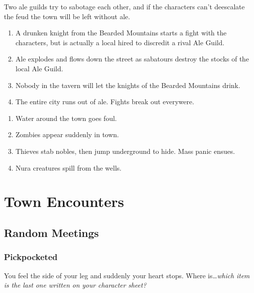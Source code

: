Two ale guilds try to sabotage each other, and if the characters can't deescalate the feud the town will be left without ale.

\begin{enumerate}

	\item{A drunken knight from the Bearded Mountains starts a fight with the characters, but is actually a local hired to discredit a rival Ale Guild.}
	\item{Ale explodes and flows down the street as sabatours destroy the stocks of the local Ale Guild.}
	\item{Nobody in the tavern will let the knights of the Bearded Mountains drink.}
	\item{ The entire city runs out of ale.  Fights break out everywere.}

\end{enumerate}


\begin{enumerate}

	\item{ Water around the town goes foul.}
	\item{ Zombies appear suddenly in town.}
	\item{ Thieves stab nobles, then jump underground to hide.  Mass panic ensues.}
	\item{  Nura creatures spill from the wells.}

\end{enumerate}

\humanthief

\section{Town Encounters}
\setcounter{encnum}{1}

\subsection{Random Meetings}\label{randommeetings}

\subsubsection{Pickpocketed}

\begin{boxtext}
	You feel the side of your leg and suddenly your heart stops.  Where is\ldots \textit{which item is the last one written on your character sheet?}
\end{boxtext}

